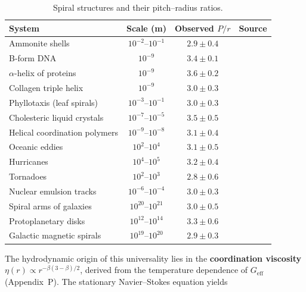 \documentclass[12pt]{article}
\begin{document}
	\begin{table}[H]
		\centering
		\caption{Spiral structures and their pitch--radius ratios.}
		\label{tab:spiral-examples}
		\small
		\begin{tabular}{@{}l c c c@{}}
			\toprule
			\textbf{System} & \textbf{Scale (m)} & \textbf{Observed \(P/r\)} & \textbf{Source} \\
			\midrule
			Ammonite shells & \(10^{-2}\)--\(10^{-1}\) & \(2.9 \pm 0.4\) & \cite{ammonites} \\
			B-form DNA & \(10^{-9}\) & \(3.4 \pm 0.1\) & \cite{watsoncrick} \\
			\(\alpha\)-helix of proteins & \(10^{-9}\) & \(3.6 \pm 0.2\) & \cite{pauling} \\
			Collagen triple helix & \(10^{-9}\) & \(3.0 \pm 0.3\) & \cite{collagen} \\
			Phyllotaxis (leaf spirals) & \(10^{-3}\)--\(10^{-1}\) & \(3.0 \pm 0.3\) & \cite{phyllotaxis} \\
			Cholesteric liquid crystals & \(10^{-7}\)--\(10^{-5}\) & \(3.5 \pm 0.5\) & \cite{cholesteric} \\
			Helical coordination polymers & \(10^{-9}\)--\(10^{-8}\) & \(3.1 \pm 0.4\) & \cite{helical-mof} \\
			Oceanic eddies & \(10^{2}\)--\(10^{4}\) & \(3.1 \pm 0.5\) & \cite{ocean-eddies} \\
			Hurricanes & \(10^{4}\)--\(10^{5}\) & \(3.2 \pm 0.4\) & \cite{hurricanes} \\
			Tornadoes & \(10^{2}\)--\(10^{3}\) & \(2.8 \pm 0.6\) & \cite{tornadoes} \\
			Nuclear emulsion tracks & \(10^{-6}\)--\(10^{-4}\) & \(3.0 \pm 0.3\) & \cite{nuclear-tracks} \\
			Spiral arms of galaxies & \(10^{20}\)--\(10^{21}\) & \(3.0 \pm 0.5\) & \cite{binney-tremaine} \\
			Protoplanetary disks & \(10^{12}\)--\(10^{14}\) & \(3.3 \pm 0.6\) & \cite{ppdisk} \\
			Galactic magnetic spirals & \(10^{19}\)--\(10^{20}\) & \(2.9 \pm 0.3\) & \cite{beck} \\
			\bottomrule
		\end{tabular}
	\end{table}
	
	The hydrodynamic origin of this universality lies in the \textbf{coordination viscosity} \(\eta(r) \propto r^{-\beta(3-\beta)/2}\), derived from the temperature dependence of \(G_{\mathrm{eff}}\) (Appendix~P). The stationary Navier--Stokes equation yields
	
\end{document}
